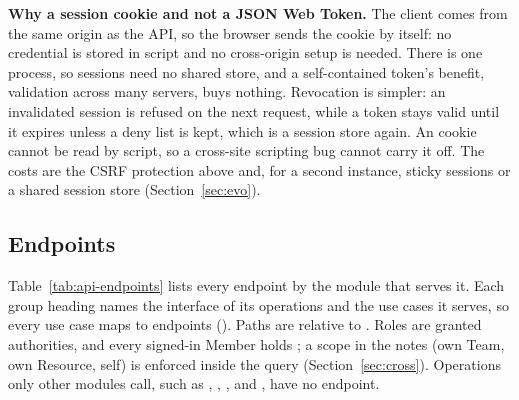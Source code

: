 \textbf{Why a session cookie and not a JSON Web Token.} The client comes from the same origin as the API, so the browser sends the cookie by itself: no credential is stored in script and no cross-origin setup is needed. There is one process, so sessions need no shared store, and a self-contained token's benefit, validation across many servers, buys nothing. Revocation is simpler: an invalidated session is refused on the next request, while a token stays valid until it expires unless a deny list is kept, which is a session store again. An  cookie cannot be read by script, so a cross-site scripting bug cannot carry it off. The costs are the CSRF protection above and, for a second instance, sticky sessions or a shared session store (Section~\ref{sec:evo}).

\subsection{Endpoints}

Table~\ref{tab:api-endpoints} lists every endpoint by the module that serves it. Each group heading names the interface of its operations and the use cases it serves, so every use case maps to endpoints (). Paths are relative to . Roles are granted authorities, and every signed-in Member holds ; a scope in the notes (own Team, own Resource, self) is enforced inside the query (Section~\ref{sec:cross}). Operations only other modules call, such as , , , and , have no endpoint.

